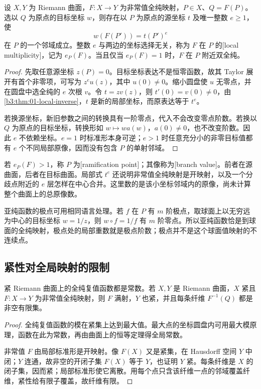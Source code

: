 \begin{proposition}[全纯映射的局部标准形]\label{b3:prop:A-local-normal-form}
设 \(X,Y\) 为 Riemann 曲面，\(F:X\rightarrow Y\) 为非常值全纯映射，\(P\in X\)、\(Q=F(P)\)。选以 \(Q\) 为原点的目标坐标 \(w\)，则存在以 \(P\) 为原点的源坐标 \(t\) 及唯一整数 \(e\ge1\)，使
\[
 w(F(P'))=t(P')^e
\]
在 \(P\) 的一个邻域成立。整数 \(e\) 与两边的坐标选择无关，称为 \(F\) 在 \(P\) 的[local multiplicity]，记为 \(e_P(F)\)。当且仅当 \(e_P(F)=1\) 时，\(F\) 在 \(P\) 附近双全纯。
\end{proposition}
\begin{proof}
先取任意源坐标 \(z(P)=0\)。目标坐标表达不是恒零函数，故其 Taylor 展开有首个非零项，可写为 \(z^e u(z)\)，其中 \(u(0)\ne0\)。缩小圆盘使 \(u\) 无零点，并在圆盘中选全纯的 \(e\) 次根 \(v\)。令 \(t=zv(z)\)，则 \(t'(0)=v(0)\ne0\)，由\cref{b3:thm:01-local-inverse}，\(t\) 是新的局部坐标，而原表达等于 \(t^e\)。

若换源坐标，新旧参数之间的转换具有一阶零点，代入不会改变零点阶数。若换以 \(Q\) 为原点的目标坐标，转换形如 \(w\mapsto w a(w)\)，\(a(0)\ne0\)，也不改变阶数。因此 \(e\) 不依赖坐标。\(e=1\) 时标准形本身可逆；\(e>1\) 时任意充分小的非零目标值都有 \(e\) 个不同局部原像，因而没有包含 \(P\) 的单射邻域。
\end{proof}

若 \(e_P(F)>1\)，称 \(P\) 为[ramification point]；其像称为[branch value]。前者在源曲面，后者在目标曲面。局部式 \(t^e\) 还说明非常值全纯映射是开映射，以及一个分歧点附近的 \(e\) 层怎样在中心合并。这里数的是该小坐标邻域内的原像，尚未计算整个曲面上的总原像数。

\ProseParagraphBreak
亚纯函数的极点可用相同语言处理。若 \(f\) 在 \(P\) 有 \(m\) 阶极点，取球面上以无穷远为中心的目标坐标 \(w=1/z\)，则 \(w\circ f=1/f\) 有 \(m\) 阶零点。所以亚纯函数恰是到球面的全纯映射，极点处的局部重数就是极点阶数；极点并不是这个球面值映射的不连续点。

\subsection{紧性对全局映射的限制}
\label{b3:subsec:A0103}

\begin{proposition}[紧曲面的函数]\label{b3:prop:A-compact-functions}
紧 Riemann 曲面上的全纯复值函数都是常数。若 \(X,Y\) 是 Riemann 曲面，\(X\) 紧且 \(F:X\rightarrow Y\) 为非常值全纯映射，则 \(F\) 满射，\(Y\) 也紧，并且每条纤维 \(F^{-1}(Q)\) 都是非空有限集。
\end{proposition}
\begin{proof}
全纯复值函数的模在紧集上达到最大值。最大点的坐标圆盘内可用最大模原理，函数在此为常数，再由曲面上的恒等定理得全局常数。

非常值 \(F\) 由局部标准形是开映射。像 \(F(X)\) 又是紧集，在 Hausdorff 空间 \(Y\) 中闭；\(Y\) 连通，故非空的开闭子集 \(F(X)\) 等于 \(Y\)，也证明 \(Y\) 紧。每条纤维是 \(X\) 的闭子集，因而紧；局部标准形使它离散。用每个点只含该纤维一点的邻域覆盖纤维，紧性给有限子覆盖，故纤维有限。
\end{proof}

